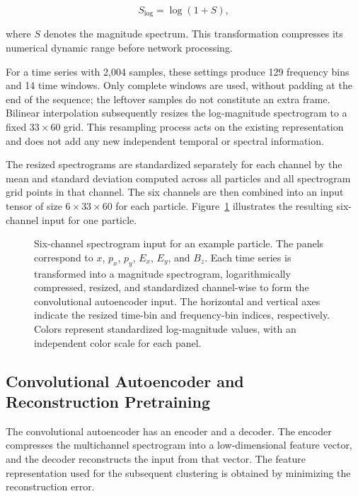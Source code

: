\begin{equation} S_{\log}=\log(1+S), \end{equation}

where \(S\) denotes the magnitude spectrum. This transformation compresses its numerical dynamic range before network processing.

For a time series with 2,004 samples, these settings produce 129 frequency bins and 14 time windows. Only complete windows are used, without padding at the end of the sequence; the leftover samples do not constitute an extra frame. Bilinear interpolation subsequently resizes the log-magnitude spectrogram to a fixed \(33\times60\) grid. This resampling process acts on the existing representation and does not add any new independent temporal or spectral information.

The resized spectrograms are standardized separately for each channel by the mean and standard deviation computed across all particles and all spectrogram grid points in that channel. The six channels are then combined into an input tensor of size \(6\times33\times60\) for each particle. Figure~\ref{fig:spectrogram} illustrates the resulting six-channel input for one particle.

\begin{figure}[htbp]
\centering
{}
\caption[Six-channel spectrogram input for an example particle]{Six-channel spectrogram input for an example particle. The panels correspond to \(x\), \(p_x\), \(p_y\), \(E_x\), \(E_y\), and \(B_z\). Each time series is transformed into a magnitude spectrogram, logarithmically compressed, resized, and standardized channel-wise to form the convolutional autoencoder input. The horizontal and vertical axes indicate the resized time-bin and frequency-bin indices, respectively. Colors represent standardized log-magnitude values, with an independent color scale for each panel.}\label{fig:spectrogram}
\end{figure}

\subsection{Convolutional Autoencoder and Reconstruction Pretraining}

The convolutional autoencoder has an encoder and a decoder. The encoder compresses the multichannel spectrogram into a low-dimensional feature vector, and the decoder reconstructs the input from that vector. The feature representation used for the subsequent clustering is obtained by minimizing the reconstruction error.

